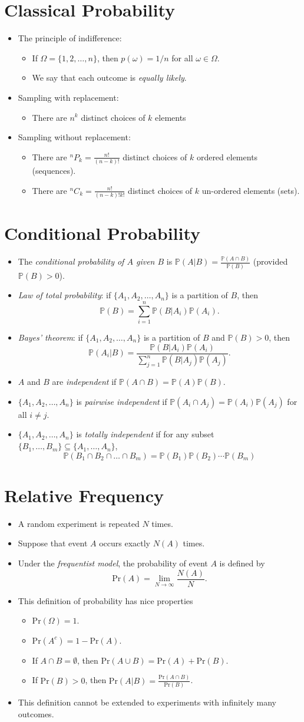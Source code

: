 \documentclass[lecture]{csm}
\newcommand{\prob}{\mathbb{P}}
\def\it{\item}
\def\bit{\begin{itemize}}
\def\eit{\end{itemize}}
\begin{document}
\section{Classical Probability}
\bit
\it The principle of indifference: 
	\bit
	\it If $\Omega=\{1,2,\ldots,n\}$, then $p(\omega)=1/n$ for all $\omega\in\Omega$.
	\it We say that each outcome is \emph{equally likely}.
	\eit
\it Sampling with replacement: 
	\bit
	\it There are $n^k$ distinct choices of $k$ elements
	\eit
\it Sampling without replacement: 
	\bit
	\it There are $^nP_k = \displaystyle\frac{n!}{(n-k)!}$ distinct choices of $k$ ordered elements (sequences).
	\it There are $^nC_k = \displaystyle\frac{n!}{(n-k)!k!}$ distinct choices of $k$ un-ordered elements (sets).
	\eit
\eit
\newpage
\section{Conditional Probability}
\bit
\it The \emph{conditional probability of $A$ given $B$} is $\displaystyle\prob(A|B) = \frac{\prob(A\cap B)}{\prob(B)}$ (provided $\prob(B)>0$).
\it \emph{Law of total probability}: if $\{A_1,A_2,\ldots,A_n\}$ is a partition of $B$, then
\[
\prob(B) = \sum_{i=1}^n \prob(B|A_i)\prob(A_i).
\]
\it \emph{Bayes' theorem}: if $\{A_1,A_2,\ldots,A_n\}$ is a partition of $B$ and $\prob(B)>0$, then
\[
\prob(A_i|B) = \frac{\prob(B|A_i)\prob(A_i)}{\sum_{j=1}^n \prob(B|A_j)\prob(A_j)}.
\]
\it $A$ and $B$ are \emph{independent} if $\prob(A\cap B)=\prob(A)\prob(B)$.
\it $\{A_1,A_2,\ldots,A_n\}$ is \emph{pairwise independent} if $\prob(A_i\cap A_j)=\prob(A_i)\prob(A_j)$ for all $i\neq j$.
\it $\{A_1,A_2,\ldots,A_n\}$ is \emph{totally independent} if for any subset $\{B_1,\ldots,B_m\}\subseteq\{A_1,\ldots,A_n\}$,
\[
\prob(B_1\cap B_2\cap \ldots \cap B_m) = \prob(B_1)\prob(B_2)\cdots\prob(B_m)
\]
\eit
\newpage
\section{Relative Frequency}
\bit
\it A random experiment is repeated $N$ times.
\it Suppose that event $A$ occurs exactly $N(A)$ times.
\it Under the \emph{frequentist model}, the probability of event $A$ is defined by
\[
\text{Pr}(A) = \lim_{N\to\infty} \frac{N(A)}{N}.
\]
\it This definition of probability has nice properties
	\bit
	\it $\text{Pr}(\Omega) = 1$.
	\it $\text{Pr}(A^c) = 1-\text{Pr}(A)$.
	\it If $A\cap B=\emptyset$, then $\text{Pr}(A\cup B) = \text{Pr}(A)+\text{Pr}(B)$.
	\it If $\text{Pr}(B)>0$, then $\displaystyle\text{Pr}(A|B) = \frac{\text{Pr}(A\cap B)}{\text{Pr}(B)}$.
	\eit
\it This definition cannot be extended to experiments with infinitely many outcomes. 
\eit
\newpage
\end{document}
